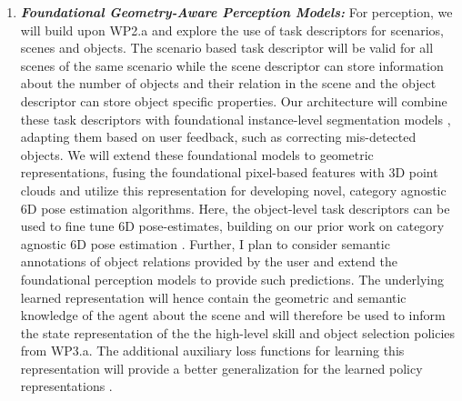 \documentclass{erc-B2}
\begin{document}
\begin{enumerate}
\item \textit{\textbf{Foundational Geometry-Aware Perception Models:}} 
For perception, we will build upon WP2.a and explore the use of task descriptors for scenarios, scenes and objects. The scenario based task descriptor will be valid for all scenes of the same scenario while the scene descriptor can store information about the number of objects and their relation in the scene and the object descriptor can store object specific properties. Our architecture will combine these task descriptors with foundational instance-level segmentation models \cite{SAM,liu2023grounding}, adapting them based on user feedback, such as correcting mis-detected objects. We will extend these foundational models to geometric representations, fusing the foundational pixel-based features with 3D point clouds and utilize this representation for developing novel, category agnostic 6D pose estimation algorithms. Here, the object-level task descriptors can be used to fine tune 6D pose-estimates, building on our prior work on category agnostic 6D pose estimation \cite{gao2023sad}. Further, I plan to consider semantic annotations of object relations provided by the user and extend the foundational perception models to provide such predictions. The underlying learned representation will hence contain the geometric and semantic knowledge of the agent about the scene and will therefore be used to inform the state representation of the the high-level skill and object selection policies from WP3.a. The additional auxiliary loss functions for learning this representation will provide a better generalization for the learned policy representations . 
 


\end{enumerate}
\end{document}
